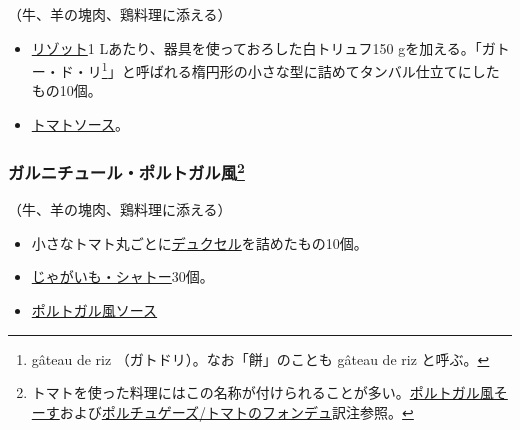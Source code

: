 \begin{recette}


（牛、羊の塊肉、鶏料理に添える）

\begin{itemize}
\item
  \protect\hyperlink{rizotto-a-la-piemontaise}{リゾット}1
  Lあたり、器具を使っておろした白トリュフ150
  gを加える。「ガトー・ド・リ\footnote{gâteau de riz
    （ガトドリ）。なお「餅」のことも gâteau de riz と呼ぶ。}」と呼ばれる楕円形の小さな型に詰めてタンバル仕立てにしたもの10個。
\item
  \protect\hyperlink{sauce-tomate}{トマトソース}。
\end{itemize}

\hypertarget{garniture-a-la-portugaise}{%
\subsubsection[ガルニチュール・ポルトガル風]{\texorpdfstring{ガルニチュール・ポルトガル風\footnote{トマトを使った料理にはこの名称が付けられることが多い。\protect\hyperlink{sauce-portugaise}{ポルトガル風そーす}および\protect\hyperlink{portugaise}{ポルチュゲーズ/トマトのフォンデュ}訳注参照。}}{ガルニチュール・ポルトガル風}}\label{garniture-a-la-portugaise}}



（牛、羊の塊肉、鶏料理に添える）

\begin{itemize}
\item
  小さなトマト丸ごとに\protect\hyperlink{duxelles-seche}{デュクセル}を詰めたもの10個。
\item
  \protect\hyperlink{pommes-de-terre-chateau}{じゃがいも・シャトー}30個。
\item
  \protect\hyperlink{sauce-portugaise}{ポルトガル風ソース}
\end{itemize}


\end{recette}

